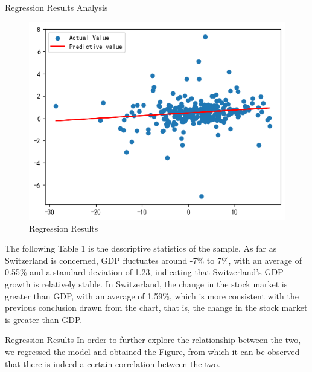 \documentclass[10pt]{beamer}
\begin{document}
\begin{frame}{Regression Results Analysis}

    \begin{figure}[htp]
    \centering
    \includegraphics[scale=0.5]{"EA2"}
    \caption{Regression Results}
    \end{figure}
    
\footnotesize The following Table 1\hyperlink{Table}{} is the descriptive statistics of the sample. As far as Switzerland is concerned, GDP fluctuates around -7\% to 7\%, with an average of 0.55\% and a standard deviation of 1.23, indicating that Switzerland's GDP growth is relatively stable. In Switzerland, the change in the stock market is greater than GDP, with an average of 1.59\%, which is more consistent with the previous conclusion drawn from the chart, that is, the change in the stock market is greater than GDP.
\end{frame}

\begin{frame}{Regression Results}
    In order to further explore the relationship between the two, we regressed the model and obtained the Figure\hyperlink{regression}{}, from which it can be observed that there is indeed a certain correlation between the two.
\end{frame}
\end{document}
